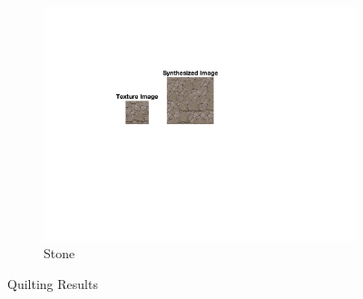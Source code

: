 \documentclass[10pt,twocolumn,letterpaper]{article}
\begin{document}
\begin{figure}
\begin{subfigure}[h]{0.33\textwidth}
   \includegraphics[trim={4.5cm 7cm 8.0cm 3cm}, clip, scale=1.5, width=\textwidth]{../results/syn_final/result_stone_B_90.png}
   \caption{Stone}
   \label{fig:apple_res}
\end{subfigure}   
       \caption{Quilting Results}
        \label{fig:quil_final}
\end{figure}
\end{document}
